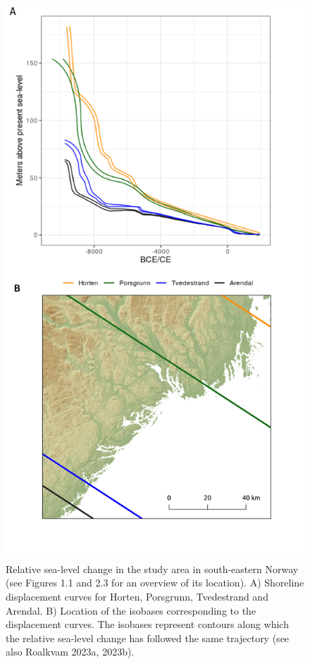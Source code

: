 \documentclass[
  12pt,
  a4paper,
  oneside]{book}
\begin{document}
\begin{figure}

{\centering \includegraphics[width=0.95\linewidth]{figures/study_rsl} 

}

\caption{Relative sea-level change in the study area in south-eastern Norway (see Figures 1.1 and 2.3 for an overview of its location). A) Shoreline displacement curves for Horten, Porsgrunn, Tvedestrand and Arendal. B) Location of the isobases corresponding to the displacement curves. The isobases represent contours along which the relative sea-level change has followed the same trajectory (see also Roalkvam 2023a, 2023b).}\label{fig:study-rsl}
\end{figure}
\end{document}

